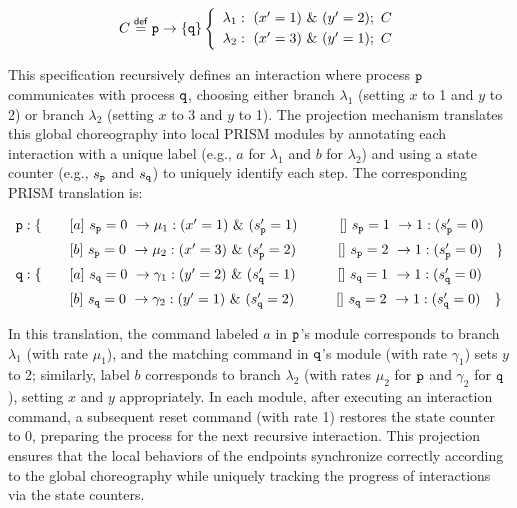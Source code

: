 \[
\begin{array}{lll}
C \stackrel{\mathsf{def}}{=} \mathtt{p}\rightarrow \{\mathtt{q}\}
\left\{
\begin{array}{lll}
\lambda_1: \ (x'=1)\ \&\ (y'=2);\ C\\[1mm]
\lambda_2: \ (x'=3)\ \&\ (y'=1);\ C
\end{array}
\right.
\end{array}
\]

This specification recursively defines an interaction where process \(\mathtt{p}\) communicates with process \(\mathtt{q}\), choosing either branch \(\lambda_1\) (setting \(x\) to 1 and \(y\) to 2) or branch \(\lambda_2\) (setting \(x\) to 3 and \(y\) to 1). 
The projection mechanism translates this global choreography into local PRISM modules by annotating each interaction with a unique label (e.g., \(a\) for \(\lambda_1\) and \(b\) for \(\lambda_2\)) and using a state counter (e.g., \(s_{\mathtt{p}}\) and \(s_{\mathtt{q}}\)) to uniquely identify each step. 
The corresponding PRISM translation is:

\[
\begin{array}{llll}
\role{p}: \{ & \quad \commandBase {a}{s_{\role p}=0} {\mu_1:(x'=1)\ \&\ (s_{\role p}'=1)} \quad\qquad \commandBase {}{s_{\role p}=1} {1:(s_{\role p}'=0)}\\[2mm]
              & \quad \commandBase {b}{s_{\role p}=0} {\mu_2:(x'=3)\ \&\ (s_{\role p}'=2)} \quad\qquad \commandBase {}{s_{\role p}=2} {1:(s_{\role p}'=0)} \quad \}\\[2mm]
\role{q}: \{ & \quad \commandBase {a}{s_{\role q}=0} {\gamma_1:(y'=2)\ \&\ (s_{\role q}'=1)} \qquad\quad \commandBase {}{s_{\role q}=1} {1:(s_{\role q}'=0)}\\[2mm]
              & \quad \commandBase {b}{s_{\role q}=0} {\gamma_2:(y'=1)\ \&\ (s_{\role q}'=2)} \qquad\quad \commandBase {}{s_{\role q}=2} {1:(s_{\role q}'=0)} \quad \}\\
\end{array}
\]

In this translation, the command labeled \(a\) in \(\mathtt{p}\)’s module corresponds to branch \(\lambda_1\) (with rate \(\mu_1\)), and the matching command in \(\mathtt{q}\)’s module (with rate \(\gamma_1\)) sets \(y\) to 2; similarly, label \(b\) corresponds to branch \(\lambda_2\) (with rates \(\mu_2\) for \(\mathtt{p}\) and \(\gamma_2\) for \(\mathtt{q}\)), setting \(x\) and \(y\) appropriately. In each module, after executing an interaction command, a subsequent reset command (with rate 1) restores the state counter to 0, preparing the process for the next recursive interaction. This projection ensures that the local behaviors of the endpoints synchronize correctly according to the global choreography while uniquely tracking the progress of interactions via the state counters.


